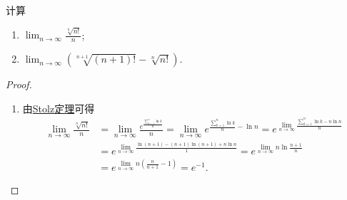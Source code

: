 \documentclass[../../main.tex]{subfiles}%
\begin{document}
\begin{example}
计算
\begin{enumerate}
\item \(\lim_{n \to \infty} \frac{\sqrt[n]{n!}}{n}\);
\item \(\lim_{n \to \infty} (\sqrt[n + 1]{(n + 1)!} - \sqrt[n]{n!})\).
\end{enumerate}
\end{example}
\begin{proof}
\begin{enumerate}
\item 由\hyperref[theorem:Stolz定理]{Stolz定理}可得
\begin{align*}
\lim_{n\rightarrow \infty} \frac{\sqrt[n]{n!}}{n}&=\lim_{n\rightarrow \infty} \frac{e^{\frac{\sum\limits_{k=1}^n{\ln k}}{n}}}{n}=\lim_{n\rightarrow \infty} e^{\frac{\sum\limits_{k=1}^n{\ln k}}{n}-\ln n}=e^{\lim\limits_{n\rightarrow \infty} \frac{\sum\limits_{k=1}^n{\ln k}-n\ln n}{n}}
\\
&=e^{\lim\limits_{n\rightarrow \infty} \frac{\ln \left(n+1\right)-\left( n+1 \right) \ln \left( n+1 \right) +n\ln n}{1}}=e^{\lim\limits_{n\rightarrow \infty} n \ln \frac{n+1}{n}}
\\
&=e^{\lim\limits_{n\rightarrow \infty} n\left( \frac{n}{n+1}-1 \right)}=e^{-1}.
\end{align*}


\end{enumerate}
\end{proof}
\end{document}
